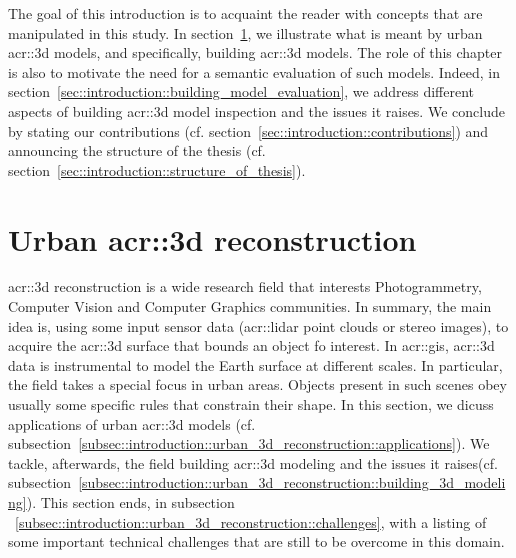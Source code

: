 \minitoc

\vfill

The goal of this introduction is to acquaint the reader with concepts that are manipulated in this study.
In section~\ref{sec::introduction::urban_3d_reconstruction}, we illustrate what is meant by urban \gls{acr::3d} models, and specifically,  building \gls{acr::3d} models.
The role of this chapter is also to motivate the need for a semantic evaluation of such models.
Indeed, in section~\ref{sec::introduction::building_model_evaluation}, we address different aspects of building \gls{acr::3d} model inspection and the issues it raises.
We conclude by stating our contributions (cf. section~\ref{sec::introduction::contributions}) and announcing the structure of the thesis (cf. section~\ref{sec::introduction::structure_of_thesis}).

\clearpage

\section{Urban \gls*{acr::3d} reconstruction}
    \label{sec::introduction::urban_3d_reconstruction}
    \gls{acr::3d} reconstruction is a wide research field that interests Photogrammetry, Computer Vision and Computer Graphics communities.
    In summary, the main idea is, using some input sensor data (\gls{acr::lidar} point clouds or stereo images), to acquire the \gls{acr::3d} surface that bounds an object fo interest.
    In \gls{acr::gis}, \gls{acr::3d} data is instrumental to model the Earth surface at different scales.
    In particular, the field takes a special focus in urban areas.
    Objects present in such scenes obey usually some specific rules that constrain their shape.
    In this section, we dicuss applications of urban \gls{acr::3d} models (cf. subsection~\ref{subsec::introduction::urban_3d_reconstruction::applications}).
    We tackle, afterwards, the field  building \gls{acr::3d} modeling and the issues it raises(cf. subsection~\ref{subsec::introduction::urban_3d_reconstruction::building_3d_modeling}).
    This section ends, in subsection ~\ref{subsec::introduction::urban_3d_reconstruction::challenges}, with a listing of some important technical challenges that are still to be overcome in this domain.

